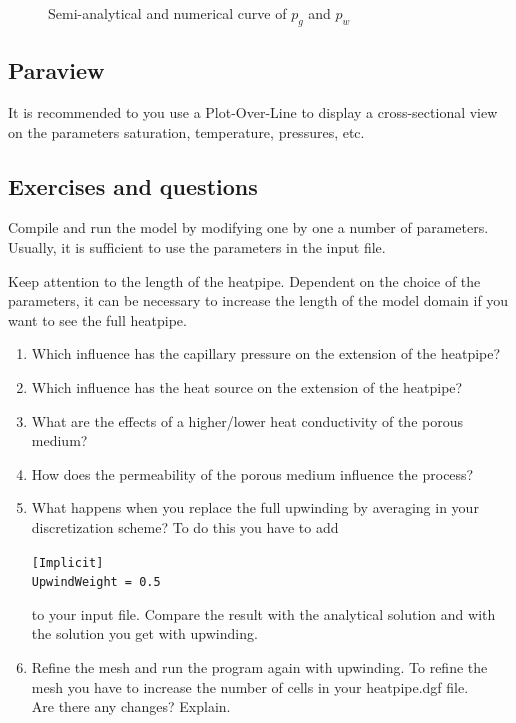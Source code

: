 \begin{figure}[h]
    \centerline{}
    \caption{Semi-analytical and numerical curve of $p_g$ and $p_w$}
\end{figure}

\clearpage

\subsection{Paraview}
It is recommended to you use a Plot-Over-Line to display a cross-sectional view
on the parameters saturation, temperature, pressures, etc.

\subsection{Exercises and questions}

Compile and run the model by modifying one by one a number of parameters.
Usually, it is sufficient to use the parameters in the input file.

Keep attention to the length of the heatpipe. Dependent on the choice of the
parameters, it can be necessary to increase the length of the model domain if
you want to see the full heatpipe.

\begin{enumerate}
\item Which influence has the capillary pressure on the extension of the heatpipe?
\item Which influence has the heat source on the extension of the heatpipe?
\item What are the effects of a higher/lower heat conductivity of the porous medium?
\item How does the permeability of the porous medium influence the process? 
\item What happens when you replace the full upwinding by averaging in your
discretization scheme? To do 
this you have to add
\begin{tabbing}
\hspace{0.5cm} \=
\texttt{[Implicit]} \\
\> \texttt{UpwindWeight = 0.5}
\end{tabbing}
to your input file.
Compare the result with the analytical solution and with the solution you get with 
upwinding.
\item  Refine the mesh and run the program again with upwinding. To refine the mesh 
you have to increase the number of cells in your heatpipe.dgf file.\\
Are there any changes? Explain.
\end{enumerate}
